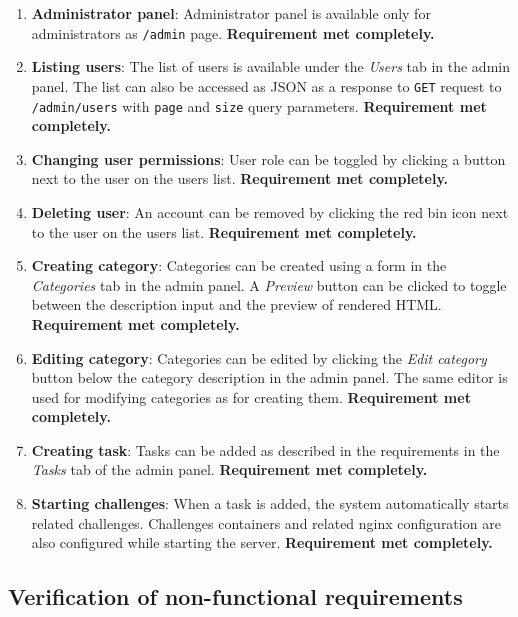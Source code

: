 \begin{enumerate}
	\item \textbf{Administrator panel}: Administrator panel is available only for administrators as \texttt{/admin} page. \textbf{Requirement met completely.}

	\item \textbf{Listing users}: The list of users is available under the \textit{Users} tab in the admin panel. The list can also be accessed as JSON as a response to \texttt{GET} request to \texttt{/admin/users} with \texttt{page} and \texttt{size} query parameters. \textbf{Requirement met completely.}

	\item \textbf{Changing user permissions}: User role can be toggled by clicking a button next to the user on the users list. \textbf{Requirement met completely.}

	\item \textbf{Deleting user}: An account can be removed by clicking the red bin icon next to the user on the users list. \textbf{Requirement met completely.}

	\item \textbf{Creating category}: Categories can be created using a form in the \textit{Categories} tab in the admin panel. A \textit{Preview} button can be clicked to toggle between the description input and the preview of rendered HTML. \textbf{Requirement met completely.}

	\item \textbf{Editing category}: Categories can be edited by clicking the \textit{Edit category} button below the category description in the admin panel. The same editor is used for modifying categories as for creating them. \textbf{Requirement met completely.}

	\item \textbf{Creating task}: Tasks can be added as described in the requirements in the \textit{Tasks} tab of the admin panel. \textbf{Requirement met completely.}

	\item \textbf{Starting challenges}: When a task is added, the system automatically starts related challenges. Challenges containers and related nginx configuration are also configured while starting the server. \textbf{Requirement met completely.}
\end{enumerate}

\subsection{Verification of non-functional requirements}

